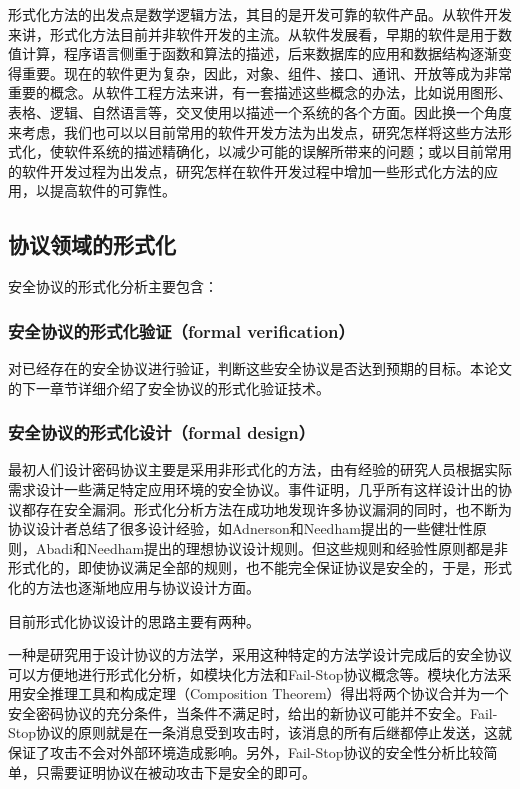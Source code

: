 \documentclass[cs4size,a4pape,UTF8]{ctexart}
\numberwithin{equation}{section}
\numberwithin{table}{section}
\numberwithin{figure}{section}
\begin{document}
形式化方法的出发点是数学逻辑方法，其目的是开发可靠的软件产品。从软件开发来讲，形式化方法目前并非软件开发的主流。从软件发展看，早期的软件是用于数值计算，程序语言侧重于函数和算法的描述，后来数据库的应用和数据结构逐渐变得重要。现在的软件更为复杂，因此，对象、组件、接口、通讯、开放等成为非常重要的概念。从软件工程方法来讲，有一套描述这些概念的办法，比如说用图形、表格、逻辑、自然语言等，交叉使用以描述一个系统的各个方面。因此换一个角度来考虑，我们也可以以目前常用的软件开发方法为出发点，研究怎样将这些方法形式化，使软件系统的描述精确化，以减少可能的误解所带来的问题；或以目前常用的软件开发过程为出发点，研究怎样在软件开发过程中增加一些形式化方法的应用，以提高软件的可靠性\cite{1}。

\subsection{协议领域的形式化}
安全协议的形式化分析主要包含：


\subsubsection{安全协议的形式化验证（formal verification）}
对已经存在的安全协议进行验证，判断这些安全协议是否达到预期的目标。本论文的下一章节详细介绍了安全协议的形式化验证技术。

\subsubsection{安全协议的形式化设计（formal design）}
最初人们设计密码协议主要是采用非形式化的方法，由有经验的研究人员根据实际需求设计一些满足特定应用环境的安全协议。事件证明，几乎所有这样设计出的协议都存在安全漏洞。形式化分析方法在成功地发现许多协议漏洞的同时，也不断为协议设计者总结了很多设计经验，如Adnerson和Needham提出的一些健壮性原则，Abadi和Needham提出的理想协议设计规则。但这些规则和经验性原则都是非形式化的，即使协议满足全部的规则，也不能完全保证协议是安全的，于是，形式化的方法也逐渐地应用与协议设计方面。

目前形式化协议设计的思路主要有两种。

一种是研究用于设计协议的方法学，采用这种特定的方法学设计完成后的安全协议可以方便地进行形式化分析，如模块化方法和Fail-Stop协议概念等。模块化方法采用安全推理工具和构成定理（Composition Theorem）得出将两个协议合并为一个安全密码协议的充分条件，当条件不满足时，给出的新协议可能并不安全。Fail-Stop协议的原则就是在一条消息受到攻击时，该消息的所有后继都停止发送，这就保证了攻击不会对外部环境造成影响。另外，Fail-Stop协议的安全性分析比较简单，只需要证明协议在被动攻击下是安全的即可。
\end{document}

